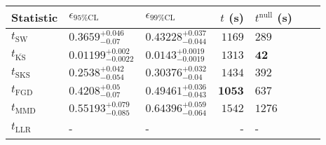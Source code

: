 \begin{tabular}{l|llr|llr}
	Statistic & $\epsilon_{95\%\mathrm{CL}}$ & $\epsilon_{99\%\mathrm{CL}}$ & $t$ (s) & $t^{\mathrm{null}}$ (s) \\
	\midrule
	$t_{\mathrm{SW}}$ & $0.3659_{-0.07}^{+0.046}$ & $0.43228_{-0.044}^{+0.037}$ & $1169$ & $289$ \\
	$t_{\overline{\mathrm{KS}}}$ & ${\mathbf{0.01199_{-0.0022}^{+0.002}}}$ & ${\mathbf{0.0143_{-0.0019}^{+0.0019}}}$ & $1313$ & ${\mathbf{42}}$ \\
	$t_{\mathrm{SKS}}$ & $0.2538_{-0.054}^{+0.042}$ & $0.30376_{-0.04}^{+0.032}$ & $1434$ & $392$ \\
	$t_{\mathrm{FGD}}$ & $0.4208_{-0.07}^{+0.05}$ & $0.49461_{-0.043}^{+0.036}$ & ${\mathbf{1053}}$ & $637$ \\
	$t_{\mathrm{MMD}}$ & $0.55193_{-0.085}^{+0.079}$ & $0.64396_{-0.064}^{+0.059}$ & $1542$ & $1276$ \\
	$t_{\mathrm{LLR}}$ & - & - & - & - \\
	\bottomrule
\end{tabular}